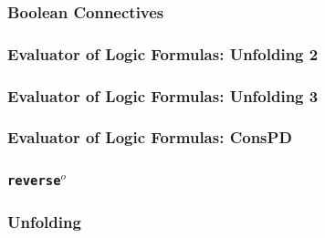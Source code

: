 \documentclass[xcolor=table]{beamer}
\begin{document}
\begin{frame}[fragile]
  \transwipe[direction=90]
  \frametitle{Boolean Connectives}

\begin{center}
  
\end{center}

\begin{center}
  
\end{center}

\begin{center}
  
\end{center}
\end{frame}

\begin{frame}[fragile]
  \transwipe[direction=90]
  \frametitle{Evaluator of Logic Formulas: Unfolding 2}

\begin{center}
  
\end{center}
\end{frame}

\begin{frame}[fragile]
  \transwipe[direction=90]
  \frametitle{Evaluator of Logic Formulas: Unfolding 3}

\begin{center}
  
\end{center}
\end{frame}

\begin{frame}[fragile]
  \transwipe[direction=90]
  \frametitle{Evaluator of Logic Formulas: ConsPD}

\begin{center}
  
\end{center}
\end{frame}

\begin{frame}[fragile]
  \transwipe[direction=90]
  \frametitle{\texttt{reverse}$^o$}

\begin{center}
  
\end{center}


\end{frame}

\begin{frame}[fragile]
  \transwipe[direction=90]
  \frametitle{Unfolding}

\begin{center}
  
\end{center}

\begin{center}
  
\end{center}

\end{frame}
\end{document}
